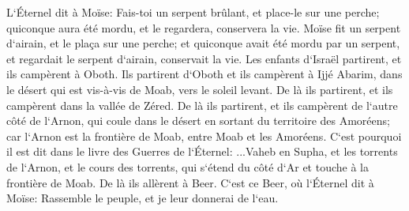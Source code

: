 \verse L`Éternel dit à Moïse: Fais-toi un serpent brûlant, et place-le sur une perche; quiconque aura été mordu, et le regardera, conservera la vie. 
\verse Moïse fit un serpent d`airain, et le plaça sur une perche; et quiconque avait été mordu par un serpent, et regardait le serpent d`airain, conservait la vie. 
\verse Les enfants d`Israël partirent, et ils campèrent à Oboth. 
\verse Ils partirent d`Oboth et ils campèrent à Ijjé Abarim, dans le désert qui est vis-à-vis de Moab, vers le soleil levant. 
\verse De là ils partirent, et ils campèrent dans la vallée de Zéred. 
\verse De là ils partirent, et ils campèrent de l`autre côté de l`Arnon, qui coule dans le désert en sortant du territoire des Amoréens; car l`Arnon est la frontière de Moab, entre Moab et les Amoréens. 
\verse C`est pourquoi il est dit dans le livre des Guerres de l`Éternel: ...Vaheb en Supha, et les torrents de l`Arnon, 
\verse et le cours des torrents, qui s`étend du côté d`Ar et touche à la frontière de Moab. 
\verse De là ils allèrent à Beer. C`est ce Beer, où l`Éternel dit à Moïse: Rassemble le peuple, et je leur donnerai de l`eau. 
